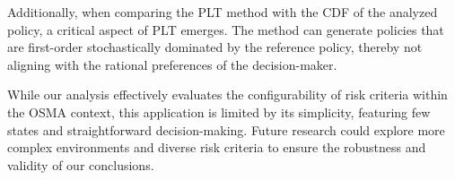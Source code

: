 \documentclass[runningheads]{llncs}
\begin{document}
Additionally, when comparing the PLT method with the CDF of the analyzed policy, a critical aspect of PLT emerges. The method can generate policies that are first-order stochastically dominated by the reference policy, thereby not aligning with the rational preferences of the decision-maker.

While our analysis effectively evaluates the configurability of risk criteria within the OSMA context, this application is limited by its simplicity, featuring few states and straightforward decision-making. Future research could explore more complex environments and diverse risk criteria to ensure the robustness and validity of our conclusions.

%
%


\end{document}
